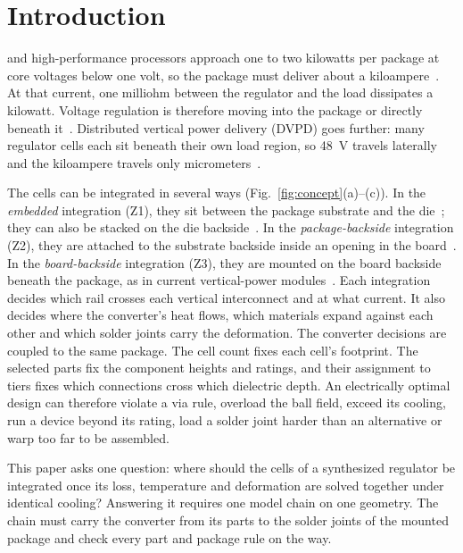 \section{Introduction}\label{sec:intro}

 and high-performance processors approach one to two
kilowatts per package at core voltages below one volt, so the package must deliver about a
kiloampere~\cite{Krishnakumar2026DVPD,Ye2026TenKiloAmp,Swaminathan2026IVPDReview}. At that
current, one milliohm between the regulator and the load dissipates a kilowatt. Voltage
regulation is therefore moving into the package or directly beneath
it~\cite{VPD2023Architectures,Ye2026TenKiloAmp}. Distributed vertical power delivery (DVPD) goes
further: many regulator cells each sit beneath their own load region, so 48~V travels laterally
and the kiloampere travels only
micrometers~\cite{Krishnakumar2026DVPD,Sriharini_ECTC_24,ISCAS2024DVPD}.

The cells can be integrated in several ways (Fig.~\ref{fig:concept}(a)--(c)). In the \emph{embedded}
integration (Z1), they sit between the package substrate and the die~\cite{Krishnakumar2026DVPD};
they can also be stacked on the die backside~\cite{GoogleBacksideIVR2021}. In the
\emph{package-backside} integration (Z2), they are attached to the substrate backside inside an
opening in the board~\cite{ArmCutoutVR2026}. In the \emph{board-backside} integration (Z3), they
are mounted on the board backside beneath the package, as in current vertical-power
modules~\cite{Vicor_VPD_AI,Baek2022LEGOPoL,Radhakrishnan2021PowerDelivery}. Each integration
decides which rail crosses each vertical interconnect and at what current. It also decides where
the converter's heat flows, which materials expand against each other and which solder joints
carry the deformation. The converter decisions are coupled to the same package. The cell count
fixes each cell's footprint. The selected parts fix the component heights and ratings, and their
assignment to tiers fixes which connections cross which dielectric depth. An
electrically optimal design can therefore violate a via rule, overload the ball field, exceed its
cooling, run a device beyond its rating, load a solder joint harder than an alternative or warp too
far to be assembled.

This paper asks one question: where should the cells of a synthesized regulator be integrated
once its loss, temperature and deformation are solved together under identical cooling?
Answering it requires one model chain on one geometry. The chain must carry the converter from
its parts to the solder joints of the mounted package and check every part and package rule on
the way.

